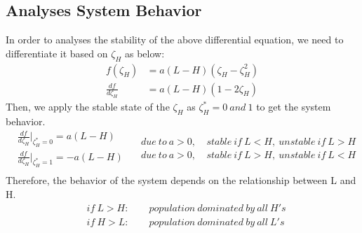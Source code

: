 \documentclass[a4paper, 12pt]{article}
\begin{document}
\subsection{Analyses System Behavior}
In order to analyses the stability of the above differential equation, we need to differentiate it based on $\zeta_{H}$ as below:
\vspace{-3mm}
\begin{equation}
\begin{split}
	f(\zeta_{H}) &= a(L-H)(\zeta_{H}-\zeta_{H}^{2}) \\
	\frac{df}{d\zeta_{H}} &= a(L-H)(1-2\zeta_{H})
\end{split}		
\end{equation}
Then, we apply the stable state of the $\zeta_{H}$ as $\zeta_{H}^{*} = 0\ and\ 1$ to get the system behavior.
\begin{equation}
	\begin{split}
		&\frac{df}{d\zeta_{H}}|_{\zeta_{H}^{*} = 0}=a(L-H)\\
		&\frac{df}{d\zeta_{H}}|_{\zeta_{H}^{*} = 1}=-a(L-H)\\
	\end{split}
	\quad
	\begin{split}
		due\ to\ a>0,\ & stable\ if\ L<H,\ unstable\ if\ L>H \\ 
		due\ to\ a>0,\ & stable\ if\ L>H,\ unstable\ if\ L<H \\
	\end{split}
\end{equation}
Therefore, the behavior of the system depends on the relationship between L and H.
\begin{equation}
\begin{split}
	&if\ L>H:\qquad population\ dominated\ by\ all\ H's \\
	&if\ H>L:\qquad population\ dominated\ by\ all\ L's \\ 
\end{split}
\end{equation}
\end{document}
